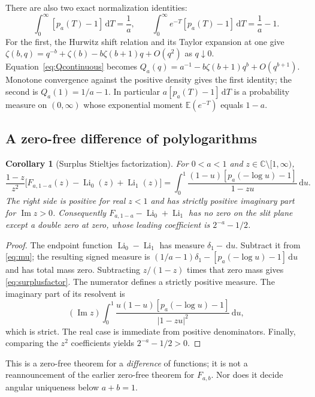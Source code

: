 \documentclass[11pt]{article}
\numberwithin{equation}{section}
\newtheorem{corollary}[theorem]{Corollary}
\theoremstyle{definition}\newtheorem{definition}[theorem]{Definition}
\theoremstyle{remark}\newtheorem{remark}[theorem]{Remark}
\newcommand{\dd}{\,\mathrm d}
\newcommand{\C}{\mathbb C}
\newcommand{\E}{\mathbb E}
\newcommand{\cut}{\C\setminus[1,\infty)}
\DeclareMathOperator{\Li}{Li}
\DeclareMathOperator{\Impart}{Im}
\begin{document}
There are also two exact normalization identities:
\begin{equation}\label{eq:surplusnormalizations}
 \int_0^\infty[p_a(T)-1]\dd T=\frac1a,
 \qquad
 \int_0^\infty e^{-T}[p_a(T)-1]\dd T=\frac1a-1.
\end{equation}
For the first, the Hurwitz shift relation and its Taylor expansion at one give
$\zeta(b,q)=q^{-b}+\zeta(b)-b\zeta(b+1)q+O(q^2)$ as $q\downarrow0$.
Equation~\eqref{eq:Qcontinuous} becomes
$Q_a(q)=a^{-1}-b\zeta(b+1)q^b+O(q^{b+1})$.
Monotone convergence against the positive density gives the first identity;
the second is $Q_a(1)=1/a-1$. In particular $a[p_a(T)-1]\dd T$ is a
probability measure on $(0,\infty)$ whose exponential moment
$\E(e^{-T})$ equals $1-a$.

\subsection{A zero-free difference of polylogarithms}
\begin{corollary}[Surplus Stieltjes factorization]\label{cor:factor}
For $0<a<1$ and $z\in\cut$,
\begin{equation}\label{eq:surplusfactor}
 \frac{1-z}{z^2}
 \bigl[F_{a,1-a}(z)-\Li_0(z)+\Li_1(z)\bigr]
 =\int_0^1\frac{(1-u)[p_a(-\log u)-1]}{1-zu}\dd u.
\end{equation}
The right side is positive for real $z<1$ and has strictly positive
imaginary part for $\Impart z>0$. Consequently
$F_{a,1-a}-\Li_0+\Li_1$ has no zero on the slit plane except a double
zero at zero, whose leading coefficient is $2^{-a}-1/2$.
\end{corollary}
\begin{proof}
The endpoint function $\Li_0-\Li_1$ has measure $\delta_1-\dd u$.
Subtract it from \eqref{eq:mu}; the resulting signed measure is
$(1/a-1)\delta_1-[p_a(-\log u)-1]\dd u$ and has total mass zero.
Subtracting $z/(1-z)$ times that zero mass gives
\eqref{eq:surplusfactor}. The numerator defines a strictly positive
measure. The imaginary part of its resolvent is
\[
 (\Impart z)\int_0^1
 \frac{u(1-u)[p_a(-\log u)-1]}{|1-zu|^2}\dd u,
\]
which is strict. The real case is immediate from positive denominators.
Finally, comparing the $z^2$ coefficients yields $2^{-a}-1/2>0$.
\end{proof}

This is a zero-free theorem for a \emph{difference} of functions; it is
not a reannouncement of the earlier zero-free theorem for $F_{a,b}$.
Nor does it decide angular uniqueness below $a+b=1$.
\end{document}

